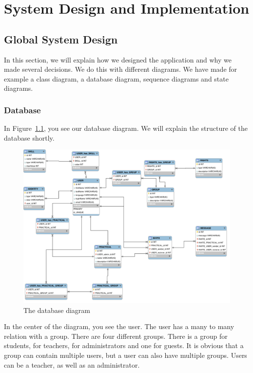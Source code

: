 \chapter{System Design and Implementation}

\section{Global System Design}
In this section, we will explain how we designed the application and why we made several decisions.
We do this with different diagrams.
We have made for example a class diagram, a database diagram, sequence diagrams and state diagrams.

\subsection{Database}
In Figure~\ref{database_diagram}, you see our database diagram.
We will explain the structure of the database shortly.

\begin{figure}[h]
    \centering
    \captionsetup{justification=centering}
    \includegraphics[width=\textwidth, frame]{images/database_diagram}
    \caption{The database diagram}
    \label{database_diagram}
\end{figure}

\noindent In the center of the diagram, you see the user.
The user has a many to many relation with a group.
There are four different groups.
There is a group for students, for teachers, for administrators and one for guests.
It is obvious that a group can contain multiple users, but a user can also have multiple groups.
Users can be a teacher, as well as an administrator.

